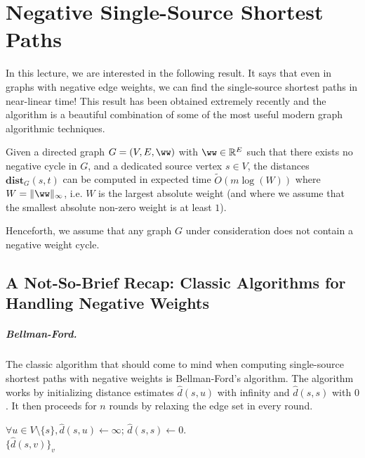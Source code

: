 
\chapter{Negative Single-Source Shortest Paths}

In this lecture, we are interested in the following result. It says that even in graphs with negative edge weights, we can find the single-source shortest paths in near-linear time! This result has been obtained extremely recently and the algorithm is a beautiful combination of some of the most useful modern graph algorithmic techniques.

\begin{theorem}\label{thm:negativeSSSPBNW}
Given a directed graph $G=(V,E, \ww)$ with $\ww \in \mathbb{R}^E$ such that there exists no negative cycle in $G$, and a dedicated source vertex $s \in V$, the distances $\mathbf{dist}_G(s,t)$ can be computed in expected time $\tilde{O}(m \log(W))$ where $W = \|\ww\|_{\infty}$, i.e. $W$ is the largest absolute weight (and where we assume that the smallest absolute non-zero weight is at least $1$).
\end{theorem}

Henceforth, we assume that any graph $G$ under consideration does not contain a negative weight cycle.

\section{A Not-So-Brief Recap: Classic Algorithms for Handling Negative Weights}

\paragraph{Bellman-Ford.} The classic algorithm that should come to mind when computing single-source shortest paths with negative weights is Bellman-Ford's algorithm. The algorithm works by initializing distance estimates $\hat{d}(s, u)$ with infinity and $\hat{d}(s,s)$ with $0$. It then proceeds for $n$ rounds by relaxing the edge set in every round. 

\begin{algorithm}
$\forall u \in V \setminus \{s\}, \hat{d}(s, u) \gets \infty$; $\hat{d}(s,s) \gets 0$.\\
\Return $\{\hat{d}(s, v) \}_v$
\caption{$\textsc{BellmanFord}(G,s)$}
\label{alg:bellmanFord}
\end{algorithm}

